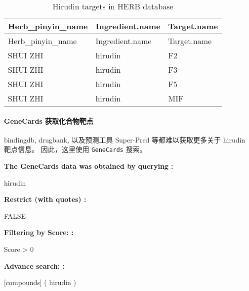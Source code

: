 \documentclass[
]{article}
\begin{document}
\begin{longtable}[]{@{}lll@{}}
\caption{\label{tab:Hirudin-targets-in-HERB-database}Hirudin targets in HERB database}\tabularnewline
\toprule
Herb\_pinyin\_name & Ingredient.name & Target.name\tabularnewline
\midrule
\endfirsthead
\toprule
Herb\_pinyin\_name & Ingredient.name & Target.name\tabularnewline
\midrule
\endhead
SHUI ZHI & hirudin & F2\tabularnewline
SHUI ZHI & hirudin & F3\tabularnewline
SHUI ZHI & hirudin & F5\tabularnewline
SHUI ZHI & hirudin & MIF\tabularnewline
\bottomrule
\end{longtable}

\hypertarget{genecards-ux83b7ux53d6ux5316ux5408ux7269ux9776ux70b9}{%
\paragraph{GeneCards 获取化合物靶点}\label{genecards-ux83b7ux53d6ux5316ux5408ux7269ux9776ux70b9}}

bindingdb, drugbank, 以及预测工具 Super-Pred 等都难以获取更多关于 hirudin 靶点信息。
因此，这里使用 \texttt{GeneCards} 搜索。

\begin{center}\begin{tcolorbox}[colback=gray!10, colframe=gray!50, width=0.9\linewidth, arc=1mm, boxrule=0.5pt]
\textbf{
The GeneCards data was obtained by querying
:}

\vspace{0.5em}

    hirudin

\vspace{2em}


\textbf{
Restrict (with quotes)
:}

\vspace{0.5em}

    FALSE

\vspace{2em}


\textbf{
Filtering by Score:
:}

\vspace{0.5em}

    Score > 0

\vspace{2em}


\textbf{
Advance search:
:}

\vspace{0.5em}

    [compounds] ( hirudin )

\vspace{2em}
\end{tcolorbox}
\end{center}
\end{document}
